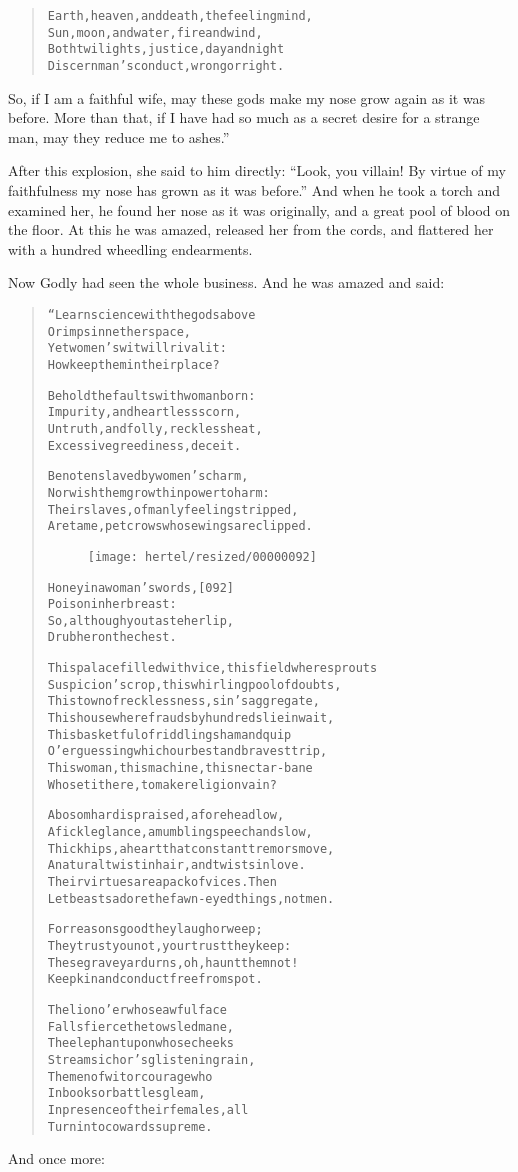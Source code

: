 \documentclass[article, twoside, 10pt]{memoir}
\renewenvironment{verbatim}{%
\begin{quote}%
\vskip -10pt%
\begin{alltt}\normalfont\small}{\end{alltt}%
\end{quote}%
\vskip -10pt
} %
\begin{document}
\begin{verbatim}
Earth, heaven, and death, the feeling mind,
Sun, moon, and water, fire and wind,
Both twilights, justice, day and night
Discern man's conduct, wrong or right.
\end{verbatim}
So, if I am a faithful wife, may these gods make my nose grow again
as it was before. More than that, if I have had so much as a secret
desire for a strange man, may they reduce me to ashes.”

After this explosion, she said to him directly:
``Look, you villain! By virtue of my faithfulness my nose has grown as it was before.''
And when he took a torch and examined her, he found her nose as it
was originally, and a great pool of blood on the floor. At this he
was amazed, released her from the cords, and flattered her with a
hundred wheedling endearments.

Now Godly had seen the whole business. And he was amazed and said:

\begin{verbatim}
“Learn science with the gods above
    Or imps in nether space,
Yet women's wit will rival it:
    How keep them in their place?

Behold the faults with woman born:
Impurity, and heartless scorn,
Untruth, and folly, reckless heat,
Excessive greediness, deceit.

Be not enslaved by women's charm,
Nor wish them growth in power to harm:
Their slaves, of manly feeling stripped,
Are tame, pet crows whose wings are clipped.

\begin{figure}[p]\texttt{[image: hertel/resized/00000092]}\end{figure}Honey in a woman's words,                               [092]
    Poison in her breast:
So, although you taste her lip,
    Drub her on the chest.

This palace filled with vice, this field where sprouts
Suspicion's crop, this whirling pool of doubts,
This town of recklessness, sin's aggregate,
This house where frauds by hundreds lie in wait,
This basketful of riddling sham and quip
O'er guessing which our best and bravest trip,
This woman, this machine, this nectar-bane{\textemdash}
Who set it here, to make religion vain?

A bosom hard is praised, a forehead low,
A fickle glance, a mumbling speech and slow,
Thick hips, a heart that constant tremors move,
A natural twist in hair, and twists in love.
Their virtues are a pack of vices. Then
Let beasts adore the fawn-eyed things, not men.

For reasons good they laugh or weep;
They trust you not, your trust they keep:
These graveyard urns, oh, haunt them not!
Keep kin and conduct free from spot.

The lion o'er whose awful face
    Falls fierce the towsled mane,
The elephant upon whose cheeks
    Streams ichor's glistening rain,
The men of wit or courage who
    In books or battles gleam,
In presence of their females, all
    Turn into cowards supreme.
\end{verbatim}
And once more:
\end{document}
